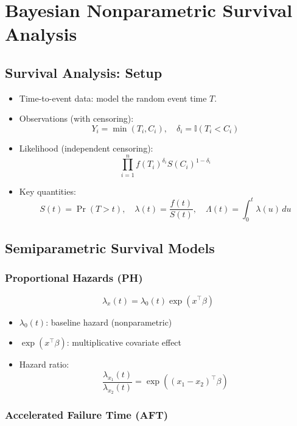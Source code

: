 \documentclass[12pt,oneside]{book}
\numberwithin{equation}{section}
\theoremstyle{definition}
\theoremstyle{plain}
\theoremstyle{remark}
\begin{document}
\chapter{Bayesian Nonparametric Survival Analysis}

\section{Survival Analysis: Setup}

\begin{itemize}
\item Time-to-event data: model the random event time $T$.

\item Observations (with censoring):
\[
Y_i = \min(T_i, C_i), \quad
\delta_i = \mathbb{I}(T_i < C_i)
\]

\item Likelihood (independent censoring):
\[
\prod_{i=1}^n f(T_i)^{\delta_i} S(C_i)^{1-\delta_i}
\]

\item Key quantities:
\[
S(t) = \Pr(T > t), \quad
\lambda(t) = \frac{f(t)}{S(t)}, \quad
\Lambda(t) = \int_0^t \lambda(u)\,du
\]
\end{itemize}

\section{Semiparametric Survival Models}

\subsection{Proportional Hazards (PH)}

\[
\lambda_x(t) = \lambda_0(t)\exp(x^\top \beta)
\]

\begin{itemize}
\item $\lambda_0(t)$: baseline hazard (nonparametric)
\item $\exp(x^\top \beta)$: multiplicative covariate effect
\item Hazard ratio:
\[
\frac{\lambda_{x_1}(t)}{\lambda_{x_2}(t)} = \exp((x_1 - x_2)^\top \beta)
\]
\end{itemize}

\subsection{Accelerated Failure Time (AFT)}
\end{document}
